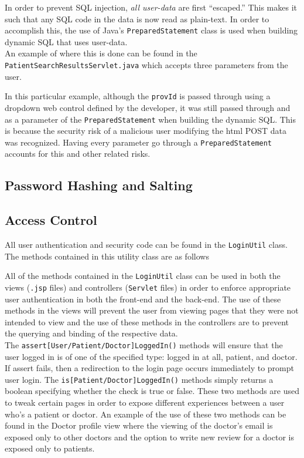 \documentclass{article}
\begin{document}
In order to prevent SQL injection, \textit{all user-data} are first ``escaped.'' This makes it such that any SQL code in the data is now read as plain-text. In order to accomplish this, the use of Java's \texttt{PreparedStatement} class is used when building dynamic SQL that uses user-data. \\

An example of where this is done can be found in the \texttt{PatientSearchResultsServlet.java} which accepts three parameters from the user.



In this particular example, although the \texttt{provId} is passed through using a dropdown web control defined by the developer, it was still passed through and as a parameter of the \texttt{PreparedStatement} when building the dynamic SQL. This is because the security risk of a malicious user modifying the html POST data was recognized. Having every parameter go through a \texttt{PreparedStatement} accounts for this and other related risks.

\subsection{Password Hashing and Salting}
\subsection{Access Control}
All user authentication and security code can be found in the \texttt{LoginUtil} class. The methods contained in this utility class are as follows



All of the methods contained in the \texttt{LoginUtil} class can be used in both the views (\texttt{.jsp} files) and controllers (\texttt{Servlet} files) in order to enforce appropriate user authentication in both the front-end and the back-end. The use of these methods in the views will prevent the user from viewing pages that they were not intended to view and the use of these methods in the controllers are to prevent the querying and binding of the respective data. \\

The \texttt{assert[User/Patient/Doctor]LoggedIn()} methods will ensure that the user logged in is of one of the specified type: logged in at all, patient, and doctor. If assert fails, then a redirection to the login page occurs immediately to prompt user login. The \texttt{is[Patient/Doctor]LoggedIn()} methods simply returns a boolean specifying whether the check is true or false. These two methods are used to tweak certain pages in order to expose different experiences between a user who's a patient or doctor. An example of the use of these two methods can be found in the Doctor profile view where the viewing of the doctor's email is exposed only to other doctors and the option to write new review for a doctor is exposed only to patients.

\end{document}
